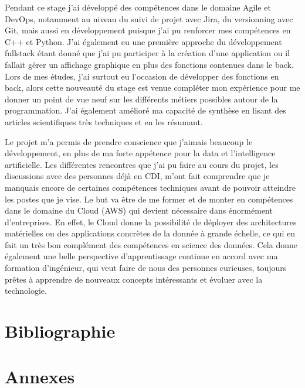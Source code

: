\documentclass[11pt]{article}
\begin{document}
      Pendant ce stage j'ai développé des compétences dans le domaine Agile et DevOps, notamment au niveau du 
      suivi de projet avec Jira, du versionning avec Git, mais aussi en développement puisque j'ai pu renforcer 
      mes compétences en C++ et Python. J'ai également eu une première approche du développement fullstack 
      étant donné que j'ai pu participer à la création d'une application ou il fallait gérer un affichage 
      graphique en plus des fonctions contenues dans le back. Lors de mes études, j'ai surtout eu l'occasion de 
      développer des fonctions en back, alors cette nouveauté du stage est venue compléter mon expérience pour me 
      donner un point de vue neuf sur les différents métiers possibles autour de la programmation.
      J'ai également amélioré ma capacité de synthèse en lisant des articles scientifiques très techniques et en 
      les résumant.

      Le projet m'a permis de prendre conscience que j'aimais beaucoup le développement, en plus de ma forte 
      appétence pour la data et l'intelligence artificielle. Les différentes rencontres que j'ai pu faire au 
      cours du projet, les discussions avec des personnes déjà en CDI, m'ont fait comprendre que je manquais
      encore de certaines compétences techniques avant de pouvoir atteindre les postes que je vise.
      Le but va être de me former et de monter en compétences dans le domaine du Cloud (AWS) qui devient nécessaire dans 
      énormément d'entreprises. En effet, le Cloud donne la possibilité de déployer des architectures matérielles ou
      des applications concrètes de la donnée à grande échelle, ce qui en fait un très bon complément des compétences en science des données.
      Cela donne également une belle perspective d'apprentissage continue en accord avec ma formation d'ingénieur, qui veut 
      faire de nous des personnes curieuses, toujours prêtes à apprendre de nouveaux concepts intéressants et évoluer avec la technologie.   

  \pagebreak
  
  \section{Bibliographie}

    \printbibliography[heading=none]

  \pagebreak
  
  \section{Annexes}
\end{document}
